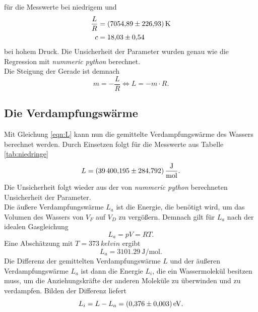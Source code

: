 für die Messwerte bei niedrigem und
\begin{align*}
  \frac{L}{R} &=  \SI{7054.89 \pm 226.93}{\kelvin}\\
  c           & =\num{18.03 \pm 0.54}
\end{align*}
bei hohem Druck. Die Unsicherheit der Parameter wurden genau wie die Regression mit \textit{nummeric python} 
berechnet.
\\
Die Steigung der Gerade ist demnach
\begin{equation}
  m=-\frac{L}{R} \Leftrightarrow L=-m\cdot R. \label{eqn:L}
\end{equation}

\subsection{Die Verdampfungswärme}
Mit Gleichung \eqref{eqn:L} kann nun die gemittelte Verdampfungswärme des Wassers berechnet werden.
Durch Einsetzen folgt für die Messwerte aus Tabelle \ref{tab:niedringe}
\begin{equation*}
  L=\SI{39400.195\pm284.792}{\joule\per\mole}.
\end{equation*}
Die Unsicherheit folgt wieder aus der von \textit{nummeric python} berechneten Unsicherheit der Parameter.
\\
Die äußere Verdampfungswärme $L_a$ ist die Energie, die benötigt wird, um das Volumen des Wassers von
$V_F$ auf $V_D$ zu vergößern. Demnach gilt für $L_a$ nach der idealen Gasgleichung
\begin{equation*}
  L_a=pV=RT.
\end{equation*}
Eine Abschätzung mit $T=\SI{373}{kelvin}$ ergibt
\begin{equation*}
  L_a=\SI{3101.29}{\joule\per\mole}.
\end{equation*}
Die Differenz der gemittelten Verdampfungswärme $L$ und der äußeren Verdampfungswärme $L_a$ ist dann 
die Energie $L_i$, die ein Wassermolekül besitzen muss, um die Anziehungskräfte der anderen Moleküle zu überwinden
und zu verdampfen. Bilden der Differenz liefert
\begin{equation*}
  L_i=L-L_a=\SI{0.376 \pm 0.003}{\electronvolt}.
\end{equation*}

